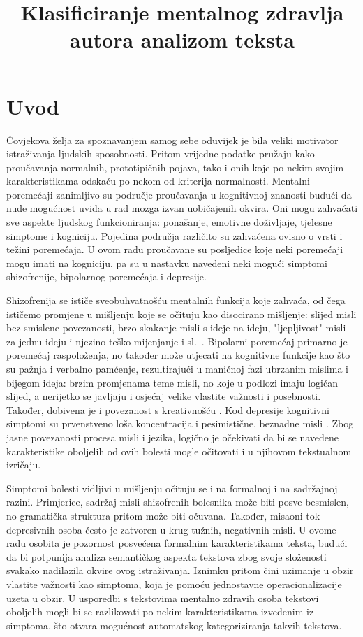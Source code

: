 \documentclass[10pt, a4paper]{article}
\title{Klasificiranje mentalnog zdravlja autora analizom teksta }
\begin{document}
\maketitleabstract

\section{Uvod}

Čovjekova želja za spoznavanjem samog sebe oduvijek je bila veliki motivator istraživanja ljudskih sposobnosti. Pritom vrijedne podatke pružaju kako proučavanja normalnih, prototipičnih pojava, tako i onih koje po nekim svojim karakteristikama odskaču po nekom od kriterija normalnosti. Mentalni poremećaji zanimljivo su područje proučavanja u kognitivnoj znanosti budući da nude mogućnost uvida u rad mozga izvan uobičajenih okvira. Oni mogu zahvaćati sve aspekte ljudskog funkcioniranja: ponašanje, emotivne doživljaje, tjelesne simptome i kogniciju. Pojedina područja različito su zahvaćena ovisno o vrsti i težini poremećaja. U ovom radu proučavane su posljedice koje neki poremećaji mogu imati na kogniciju, pa su u nastavku navedeni neki mogući simptomi shizofrenije, bipolarnog poremećaja i depresije.

Shizofrenija se ističe sveobuhvatnošću mentalnih funkcija koje zahvaća, od čega ističemo promjene u mišljenju koje se očituju kao disocirano mišljenje: slijed misli bez smislene povezanosti, brzo skakanje misli s ideje na ideju, "ljepljivost" misli za jednu ideju i njezino teško mijenjanje i sl.~\citep{icd}. Bipolarni poremećaj primarno je poremećaj raspoloženja, no također može utjecati na kognitivne funkcije kao što su pažnja i verbalno pamćenje, rezultirajući u maničnoj fazi ubrzanim mislima i bijegom ideja: brzim promjenama teme misli, no koje u podlozi imaju logičan slijed, a nerijetko se javljaju i osjećaj velike vlastite važnosti i posebnosti. Također, dobivena je i povezanost s kreativnošću \citep{crea}. Kod depresije kognitivni simptomi su prvenstveno loša koncentracija i pesimistične, beznadne misli \citep{dsm}. Zbog jasne povezanosti procesa misli i jezika, logično je očekivati da bi se navedene karakteristike oboljelih od ovih bolesti mogle očitovati i u njihovom tekstualnom izričaju. 

Simptomi bolesti vidljivi u mišljenju očituju se i na formalnoj i na sadržajnoj razini. Primjerice, sadržaj misli shizofrenih bolesnika može biti posve besmislen, no gramatička struktura pritom može biti očuvana. Također, misaoni tok depresivnih osoba često je zatvoren u krug tužnih, negativnih misli. U ovome radu osobita je pozornost posvećena formalnim karakteristikama teksta, budući da bi potpunija analiza semantičkog aspekta tekstova zbog svoje složenosti svakako nadilazila okvire ovog istraživanja. Iznimku pritom čini uzimanje u obzir vlastite važnosti kao simptoma, koja je pomoću jednostavne operacionalizacije uzeta u obzir. U usporedbi s tekstovima mentalno zdravih osoba tekstovi oboljelih mogli bi se razlikovati po nekim karakteristikama izvedenim iz simptoma, što otvara mogućnost automatskog kategoriziranja takvih tekstova. 
\end{document}
